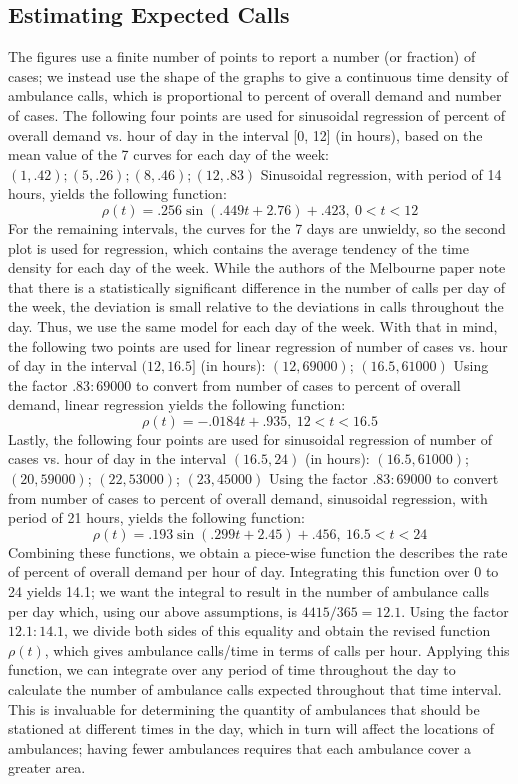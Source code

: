 \documentclass{article}
\begin{document}
\subsection{Estimating Expected Calls}
The figures use a finite number of points to report a number (or fraction) of cases; we instead use the shape of the graphs to give a continuous time density of ambulance calls, which is proportional to percent of overall demand and number of cases. The following four points are used for sinusoidal regression of percent of overall demand vs. hour of day in the interval [0, 12] (in hours), based on the mean value of the 7 curves for each day of the week: $(1, .42); (5, .26); (8, .46); (12, .83)$
Sinusoidal regression, with period of 14 hours, yields the following function: 
$$\rho(t) = .256\sin(.449t + 2.76) + .423, \  0 < t < 12$$
For the remaining intervals, the curves for the 7 days are unwieldy, so the second plot is used for regression, which contains the average tendency of the time density for each day of the week. While the authors of the Melbourne paper note that there is a statistically significant difference in the number of calls per day of the week, the deviation is small relative to the deviations in calls throughout the day. Thus, we use the same model for each day of the week. With that in mind, the following two points are used for linear regression of number of cases vs. hour of day in the interval $(12, 16.5]$ (in hours): $(12, 69000)$; $(16.5, 61000)$
Using the factor $.83:69000$ to convert from number of cases to percent of overall demand, linear regression yields the following function: 
$$\rho(t) = -.0184t + .935,  \ 12 < t < 16.5$$
Lastly, the following four points are used for sinusoidal regression of number of cases vs. hour of day in the interval $(16.5, 24)$ (in hours): $(16.5, 61000)$; $(20, 59000)$; $(22, 53000)$; $(23, 45000)$
Using the factor $.83:69000$ to convert from number of cases to percent of overall demand, sinusoidal regression, with period of 21 hours, yields the following function: 
$$\rho(t) = .193\sin(.299t + 2.45) + .456, \ 16.5 < t < 24$$
Combining these functions, we obtain a piece-wise function the describes the rate of percent of overall demand per hour of day.
Integrating this function over 0 to 24 yields 14.1; we want the integral to result in the number of ambulance calls per day which, using our above assumptions, is $4415/365 = 12.1$. Using the factor $12.1:14.1$, we divide both sides of this equality and obtain the revised function $\rho(t)$, which gives ambulance calls/time in terms of calls per hour.
Applying this function, we can integrate over any period of time throughout the day to calculate the number of ambulance calls expected throughout that time interval. This is invaluable for determining the quantity of ambulances that should be stationed at different times in the day, which in turn will affect the locations of ambulances; having fewer ambulances requires that each ambulance cover a greater area.
\end{document}
